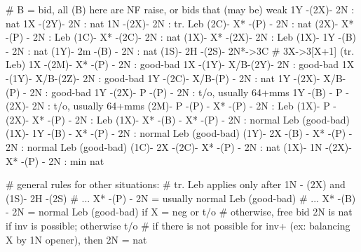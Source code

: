 # B = bid, all (B) here are NF raise, or bids that (may be) weak
 1Y -(2X)- 2N : nat
 1X -(2Y)- 2N : nat
 1N -(2X)- 2N : tr. Leb
(2C)- X* -(P) - 2N : nat
(2X)- X* -(P) - 2N : Leb
(1C)- X* -(2C)- 2N : nat
(1X)- X* -(2X)- 2N : Leb 
(1X)- 1Y -(B) - 2N : nat
(1Y)- 2m -(B) - 2N : nat
(1S)- 2H -(2S)- 2N*->3C # 3X->3[X+1] (tr. Leb)
 1X -(2M)- X* -(P) - 2N : good-bad
 1X -(1Y)- X/B-(2Y)- 2N : good-bad
 1X -(1Y)- X/B-(2Z)- 2N : good-bad 
 1Y -(2C)- X/B-(P) - 2N : nat 
 1Y -(2X)- X/B-(P) - 2N : good-bad
 1Y -(2X)- P  -(P) - 2N : t/o, usually 64+mms
 1Y -(B) - P  -(2X)- 2N : t/o, usually 64+mms
(2M)- P  -(P) - X* -(P) - 2N : Leb
(1X)- P  -(2X)- X* -(P) - 2N : Leb
(1X)- X* -(B) - X* -(P) - 2N : normal Leb (good-bad)
(1X)- 1Y -(B) - X* -(P) - 2N : normal Leb (good-bad)
(1Y)- 2X -(B) - X* -(P) - 2N : normal Leb (good-bad)
(1C)- 2X -(2C)- X* -(P) - 2N : nat
(1X)- 1N -(2X)- X* -(P) - 2N : min nat

# general rules for other situations: 
# tr. Leb applies only after 1N - (2X) and (1S)- 2H -(2S)
# ... X* -(P) - 2N = usually normal Leb (good-bad)
# ... X* -(B) - 2N = normal Leb (good-bad) if X = neg or t/o
# otherwise, free bid 2N is nat if inv is possible; otherwise t/o
# if there is not possible for inv+ (ex: balancing X by 1N opener), then 2N = nat